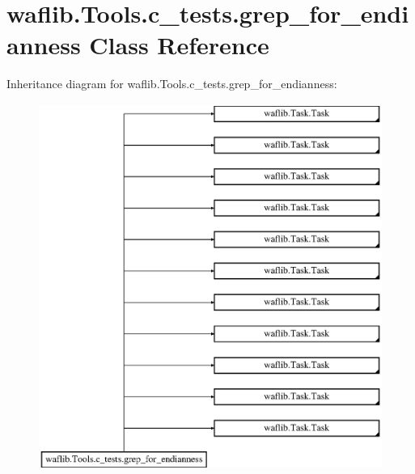 \hypertarget{classwaflib_1_1_tools_1_1c__tests_1_1grep__for__endianness}{}\section{waflib.\+Tools.\+c\+\_\+tests.\+grep\+\_\+for\+\_\+endianness Class Reference}
\label{classwaflib_1_1_tools_1_1c__tests_1_1grep__for__endianness}
Inheritance diagram for waflib.\+Tools.\+c\+\_\+tests.\+grep\+\_\+for\+\_\+endianness\+:\begin{figure}[H]
\begin{center}
\leavevmode
\includegraphics[height=12.000000cm]{classwaflib_1_1_tools_1_1c__tests_1_1grep__for__endianness}
\end{center}
\end{figure}
